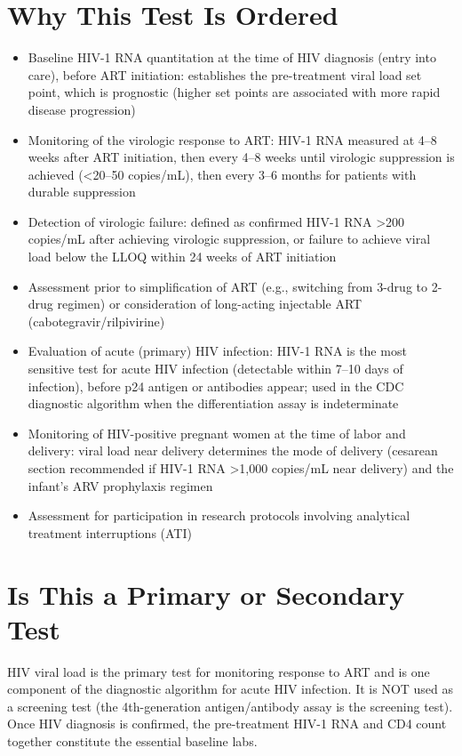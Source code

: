 \section*{Why This Test Is Ordered}
\begin{itemize}
  \item Baseline HIV-1 RNA quantitation at the time of HIV diagnosis (entry into care), before ART initiation: establishes the pre-treatment viral load set point, which is prognostic (higher set points are associated with more rapid disease progression)
  \item Monitoring of the virologic response to ART: HIV-1 RNA measured at 4--8 weeks after ART initiation, then every 4--8 weeks until virologic suppression is achieved (<20--50 copies/mL), then every 3--6 months for patients with durable suppression
  \item Detection of virologic failure: defined as confirmed HIV-1 RNA >200 copies/mL after achieving virologic suppression, or failure to achieve viral load below the LLOQ within 24 weeks of ART initiation
  \item Assessment prior to simplification of ART (e.g., switching from 3-drug to 2-drug regimen) or consideration of long-acting injectable ART (cabotegravir/rilpivirine)
  \item Evaluation of acute (primary) HIV infection: HIV-1 RNA is the most sensitive test for acute HIV infection (detectable within 7--10 days of infection), before p24 antigen or antibodies appear; used in the CDC diagnostic algorithm when the differentiation assay is indeterminate
  \item Monitoring of HIV-positive pregnant women at the time of labor and delivery: viral load near delivery determines the mode of delivery (cesarean section recommended if HIV-1 RNA >1,000 copies/mL near delivery) and the infant's ARV prophylaxis regimen
  \item Assessment for participation in research protocols involving analytical treatment interruptions (ATI)
\end{itemize}

\section*{Is This a Primary or Secondary Test}
HIV viral load is the primary test for monitoring response to ART and is one component of the diagnostic algorithm for acute HIV infection. It is NOT used as a screening test (the 4th-generation antigen/antibody assay is the screening test). Once HIV diagnosis is confirmed, the pre-treatment HIV-1 RNA and CD4 count together constitute the essential baseline labs.

